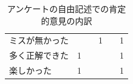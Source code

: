 \begin{table}[htbp]
\begin{tabular}{lrrrrr}
ミスが無かった     &                             &                            & 1                           &                            & 1                                       \\
多く正解できた     & 1                           &                            &                             &                            & 1                                       \\
楽しかった       & 1                           &                            &                             &                            & 1                                       \\ \hline
\end{tabular}
\caption{アンケートの自由記述での肯定的意見の内訳}
\label{table:posi}
\end{table}

